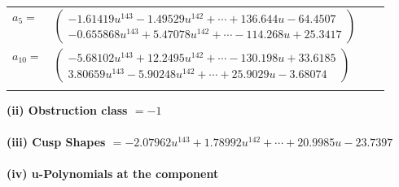 \documentclass[1p]{elsarticle_modified}
\theoremstyle{definition}
\begin{document}
\begin{tabular}{m{7pt} m{180pt} m{7pt} m{180pt} }
\flushright $a_{5}=$&$\begin{pmatrix}-1.61419 u^{143}-1.49529 u^{142}+\cdots+136.644 u-64.4507\\-0.655868 u^{143}+5.47078 u^{142}+\cdots-114.268 u+25.3417\end{pmatrix}$ \\
\flushright $a_{10}=$&$\begin{pmatrix}-5.68102 u^{143}+12.2495 u^{142}+\cdots-130.198 u+33.6185\\3.80659 u^{143}-5.90248 u^{142}+\cdots+25.9029 u-3.68074\end{pmatrix}$\\&\end{tabular}
\flushleft \textbf{(ii) Obstruction class $= -1$}\\~\\
\flushleft \textbf{(iii) Cusp Shapes $= -2.07962 u^{143}+1.78992 u^{142}+\cdots+20.9985 u-23.7397$}\\~\\
\newpage\renewcommand{\arraystretch}{1}
\flushleft \textbf{(iv) u-Polynomials at the component}\newline \\
\end{document}
